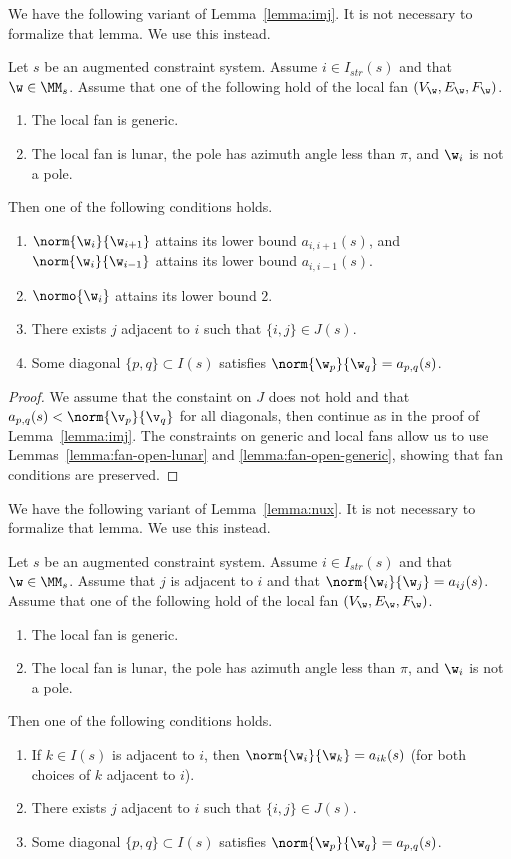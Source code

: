 We have the following variant of Lemma~\ref{lemma:imj}.
It is not necessary to formalize that lemma.  We use this instead.

\begin{lemma}
Let $s$ be an augmented constraint system.  Assume $i\in I_{str}(s)$ and
that $\w\in \MM_s$.  
Assume  that one of the following hold of the local fan $(V_\w,E_\w,F_\w)$.
\begin{enumerate}
\item The local fan is generic.
\item The local fan is lunar, the pole has azimuth
angle less than $\pi$, and $\w_i$ is not a pole.  
\end{enumerate}
Then one of the following conditions holds.
\begin{enumerate}
\item $\norm{\w_i}{\w_{i+1}}$ attains its lower bound $a_{i,i+1}(s)$, and
 $\norm{\w_i}{\w_{i-1}}$ attains its lower bound $a_{i,i-1}(s)$.
\item $\normo{\w_i}$ attains its lower bound $2$.
\item There exists $j$ adjacent to $i$ such that $\{i,j\}\in J(s)$.
\item Some diagonal $\{p,q\}\subset I(s)$ satisfies
$\norm{\w_p}{\w_q}=a_{p,q}(s)$.
\end{enumerate}
\end{lemma}

\begin{proof} We assume that the constaint on $J$ does not hold and
that $a_{p,q}(s)<\norm{\v_p}{\v_q}$ for all diagonals, then continue as in the proof of
Lemma~\ref{lemma:imj}.
The constraints on generic and local fans
allow us to use Lemmas~\ref{lemma:fan-open-lunar} and
\ref{lemma:fan-open-generic}, showing that fan conditions are preserved.
\end{proof}

We have the following variant of Lemma~\ref{lemma:nux}.
It is not necessary to formalize that lemma.  We use this instead.

\begin{lemma}
Let $s$ be an augmented constraint system.  Assume $i\in I_{str}(s)$
and that $\w\in \MM_s$.   Assume that $j$ is adjacent to $i$ and
that $\norm{\w_i}{\w_j}=a_{ij}(s)$.    
Assume  that one of the following hold of the local fan $(V_\w,E_\w,F_\w)$.
\begin{enumerate}
\item The local fan is generic.
\item The local fan is lunar, the pole has azimuth
angle less than $\pi$, and $\w_i$ is not a pole.  
\end{enumerate}
Then
one of the following conditions holds.
\begin{enumerate}
\item If $k\in I(s)$ is adjacent to $i$, then $\norm{\w_i}{\w_k}=a_{ik}(s)$
(for both choices of $k$ adjacent to $i$).
\item There exists $j$ adjacent to $i$ such that $\{i,j\}\in J(s)$.
\item Some diagonal $\{p,q\}\subset I(s)$ satisfies
$\norm{\w_p}{\w_q}=a_{p,q}(s)$.
\end{enumerate}
\end{lemma}

